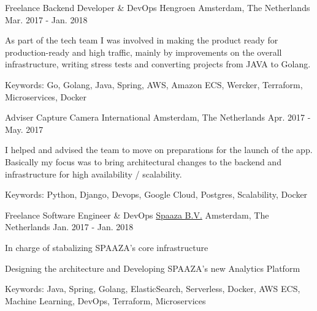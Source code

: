 \begin{cventries}
  \cventry
    {Freelance Backend Developer \& DevOps} %
    {Hengroen} %
    {Amsterdam, The Netherlands} %
    {Mar. 2017 - Jan. 2018} %
    {
      \begin{cvitems} %
        \item {As part of the tech team I was involved in making the product ready for production-ready and high traffic, mainly by improvements on the overall infrastructure, writing stress tests and converting projects from JAVA to Golang.}
        \item {Keywords: Go, Golang, Java, Spring, AWS, Amazon ECS, Wercker, Terraform, Microservices, Docker}
      \end{cvitems}
    }

  \cventry
    {Adviser} %
    {Capture Camera International} %
    {Amsterdam, The Netherlands} %
    {Apr. 2017 - May. 2017} %
    {
    \begin{cvitems} %
      \item {I helped and advised the team to move on preparations for the launch of the app. Basically my focus was to bring architectural changes to the backend and infrastructure for high availability / scalability.}
      \item {Keywords: Python, Django, Devops, Google Cloud, Postgres, Scalability, Docker}
    \end{cvitems}
    }

  \cventry
    {Freelance Software Engineer \& DevOps} %
    {\href{https://www.spaaza.com/}{Spaaza B.V.}} %
    {Amsterdam, The Netherlands} %
    {Jan. 2017 - Jan. 2018} %
    {
      \begin{cvitems} %
        \item {In charge of stabalizing SPAAZA's core infrastructure}
        \item {Designing the architecture and Developing SPAAZA's new Analytics Platform}
        \item {Keywords: Java, Spring, Golang, ElasticSearch, Serverless, Docker, AWS ECS, Machine Learning, DevOps, Terraform, Microservices}
      \end{cvitems}
    }


\end{cventries}
